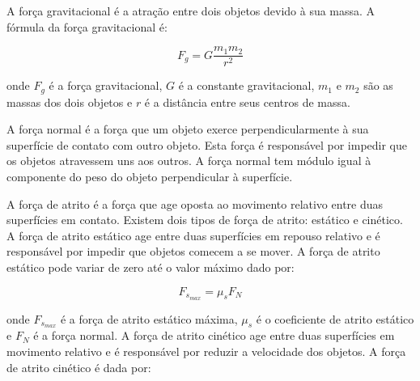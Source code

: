 \documentclass{article}
\begin{document}
A força gravitacional é a atração entre dois objetos devido à sua massa. A fórmula da força gravitacional é:

\begin{equation}
F_g = G \frac{m_1 m_2}{r^2}
\end{equation}

onde $F_g$ é a força gravitacional, $G$ é a constante gravitacional, $m_1$ e $m_2$ são as massas dos dois objetos e $r$ é a distância entre seus centros de massa.
\begin{center}
\end{center}

A força normal é a força que um objeto exerce perpendicularmente à sua superfície de contato com outro objeto. Esta força é responsável por impedir que os objetos atravessem uns aos outros. A força normal tem m\'odulo igual à componente do peso do objeto perpendicular à superfície.

\begin{center}
\end{center}

A força de atrito é a força que age oposta ao movimento relativo entre duas superfícies em contato. Existem dois tipos de força de atrito: estático e cinético.
A força de atrito estático age entre duas superfícies em repouso relativo e é responsável por impedir que objetos comecem a se mover. A força de atrito estático pode variar de zero até o valor máximo dado por:

\begin{equation}
F_{s_{max}} = \mu_s F_N
\end{equation}

onde $F_{s_{max}}$ é a força de atrito estático máxima, $\mu_s$ é o coeficiente de atrito estático e $F_N$ é a força normal.
A força de atrito cinético age entre duas superfícies em movimento relativo e é responsável por reduzir a velocidade dos objetos. A força de atrito cinético é dada por:
\end{document}
